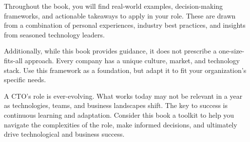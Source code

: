 Throughout the book, you will find real-world examples, decision-making frameworks, and actionable takeaways to apply in your role. These are drawn from a combination of personal experiences, industry best practices, and insights from seasoned technology leaders.

Additionally, while this book provides guidance, it does not prescribe a one-size-fits-all approach. Every company has a unique culture, market, and technology stack. Use this framework as a foundation, but adapt it to fit your organization's specific needs.

A CTO's role is ever-evolving. What works today may not be relevant in a year as technologies, teams, and business landscapes shift. The key to success is continuous learning and adaptation. Consider this book a toolkit to help you navigate the complexities of the role, make informed decisions, and ultimately drive technological and business success.


